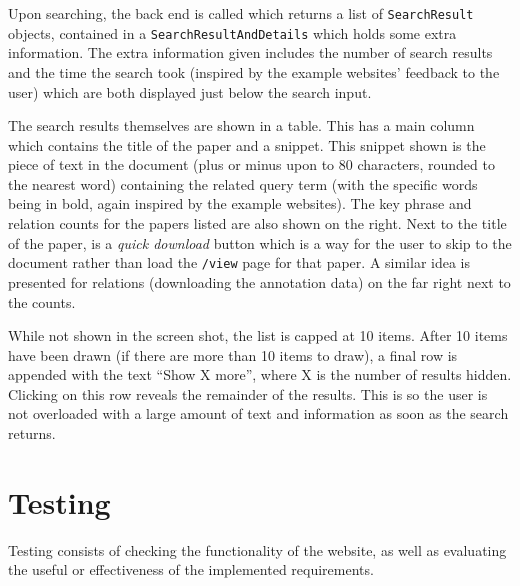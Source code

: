 Upon searching, the back end is called which returns a list of \texttt{SearchResult} objects, contained in a \texttt{SearchResultAndDetails} which holds some extra information. The extra information given includes the number of search results and the time the search took (inspired by the example websites' feedback to the user) which are both displayed just below the search input.

The search results themselves are shown in a table. This has a main column which contains the title of the paper and a snippet. This snippet shown is the piece of text in the document (plus or minus upon to 80 characters, rounded to the nearest word) containing the related query term (with the specific words being in bold, again inspired by the example websites). The key phrase and relation counts for the papers listed are also shown on the right. Next to the title of the paper, is a \textit{quick download} button which is a way for the user to skip to the document rather than load the \texttt{/view} page for that paper. A similar idea is presented for relations (downloading the annotation data) on the far right next to the counts.

While not shown in the screen shot, the list is capped at 10 items. After 10 items have been drawn (if there are more than 10 items to draw), a final row is appended with the text ``Show X more'', where X is the number of results hidden. Clicking on this row reveals the remainder of the results. This is so the user is not overloaded with a large amount of text and information as soon as the search returns. 

\section{Testing}
Testing consists of checking the functionality of the website, as well as evaluating the useful or effectiveness of the implemented requirements.

